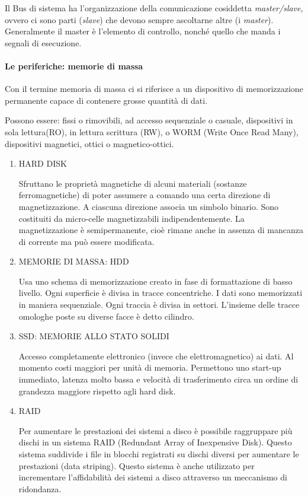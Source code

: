 \documentclass[
]{article}
\begin{document}
Il Bus di sistema ha l'organizzazione della comunicazione cosiddetta
\emph{master/slave}, ovvero ci sono parti (\emph{slave}) che devono
sempre ascoltarne altre (i \emph{master}). Generalmente il master è
l'elemento di controllo, nonché quello che manda i segnali di
esecuzione.

\hypertarget{header-n242}{%
\paragraph{Le periferiche: memorie di massa}\label{header-n242}}

Con il termine memoria di massa ci si riferisce a un dispositivo di
memorizzazione permanente capace di contenere grosse quantità di dati.

Possono essere: fissi o rimovibili, ad accesso sequenziale o casuale,
dispositivi in sola lettura(RO), in lettura scrittura (RW), o WORM
(Write Once Read Many), dispositivi magnetici, ottici o
magnetico-ottici.

\begin{enumerate}
\def\labelenumi{\arabic{enumi}.}
\item
  HARD DISK

  Sfruttano le proprietà magnetiche di alcuni materiali (sostanze
  ferromagnetiche) di poter assumere a comando una certa direzione di
  magnetizzazione. A ciascuna direzione associa un simbolo binario. Sono
  costituiti da micro-celle magnetizzabili indipendentemente. La
  magnetizzazione è semipermanente, cioè rimane anche in assenza di
  mancanza di corrente ma può essere modificata.
\item
  MEMORIE DI MASSA: HDD

  Usa uno schema di memorizzazione creato in fase di formattazione di
  basso livello. Ogni superficie è divisa in tracce concentriche. I dati
  sono memorizzati in maniera sequenziale. Ogni traccia è divisa in
  settori. L'insieme delle tracce omologhe poste su diverse facce è
  detto cilindro.
\item
  SSD: MEMORIE ALLO STATO SOLIDI

  Accesso completamente elettronico (invece che elettromagnetico) ai
  dati. Al momento costi maggiori per unità di memoria. Permettono uno
  start-up immediato, latenza molto bassa e velocità di trasferimento
  circa un ordine di grandezza maggiore rispetto agli hard disk.
\item
  RAID

  Per aumentare le prestazioni dei sistemi a disco è possibile
  raggruppare più dischi in un sistema RAID (Redundant Array of
  Inexpensive Disk). Questo sistema suddivide i file in blocchi
  registrati su dischi diversi per aumentare le prestazioni (data
  striping). Questo sistema è anche utilizzato per incrementare
  l'affidabilità dei sistemi a disco attraverso un meccanismo di
  ridondanza.
\end{enumerate}
\end{document}
